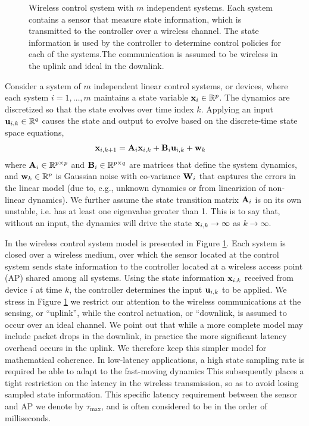 \begin{figure}
\centering

\caption{Wireless control system with $m$ independent systems. Each system contains a sensor that measure state information, which is transmitted to the controller over a wireless channel. The state information is used by the controller to determine control policies for each of the systems.The communication is assumed to be wireless in the uplink and ideal in the downlink.}
\label{fig_wcs}
\end{figure}


Consider a system of $m$ independent linear control systems, or devices, where each system $i=1,\hdots,m$ maintains a state variable ${\mathbf x}_{i} \in {\mathbb R}^p$. The dynamics are discretized so that the state evolves over time index $k$.  Applying an input ${\mathbf u}_{i,k} \in {\mathbb R}^q$ causes the state and output to evolve based on the discrete-time  state space equations,
%
\begin{align}\label{eq_control_orig}
\bbx_{i,k+1} &= \bbA_{i} \bbx_{i,k} + \bbB_{i} \bbu_{i,k} + \bbw_k
\end{align}
%
where ${\mathbf A}_{i} \in {\mathbb R}^{p \times p}$ and ${\mathbf B}_{i} \in {\mathbb R}^{p \times q}$ are matrices that define the system dynamics, and ${\mathbf w}_{k} \in {\mathbb R}^{p}$ is Gaussian noise with co-variance ${\mathbf W}_i$ that captures the errors in the linear model (due to, e.g., unknown dynamics or from linearizion of non-linear dynamics). We further assume the state transition matrix ${\mathbf A}_i$ is on its own unstable, i.e. has at least one eigenvalue greater than 1. This is to say that, without an input, the dynamics will drive the state ${\mathbf x}_{i,k} \rightarrow \infty$ as $k \rightarrow \infty$.

In the wireless control system model is presented in Figure \ref{fig_wcs}. Each system is closed over a wireless medium, over which the sensor located at the control system sends state information to the controller located at a wireless access point (AP) shared among all systems. Using the state information ${\mathbf x}_{i,k}$ received from device $i$ at time $k$, the controller determines the input $ {\mathbf u}_{i,k}$ to be applied. We stress in Figure \ref{fig_wcs} we restrict our attention to the wireless communications at the sensing, or ``uplink'', while the control actuation, or ``downlink, is assumed to occur over an ideal channel. We point out that while a more complete model may include packet drops in the downlink, in practice the more significant latency overhead occurs in the uplink. We therefore keep this simpler model for mathematical coherence. In low-latency applications, a high state sampling rate is required be able to adapt to the fast-moving dynamics  This subsequently places a tight restriction on the latency in the wireless transmission, so as to avoid losing sampled state information. This specific latency requirement between the sensor and AP we denote by $\tau_{\max}$, and is often considered to be in the order of milliseconds.

